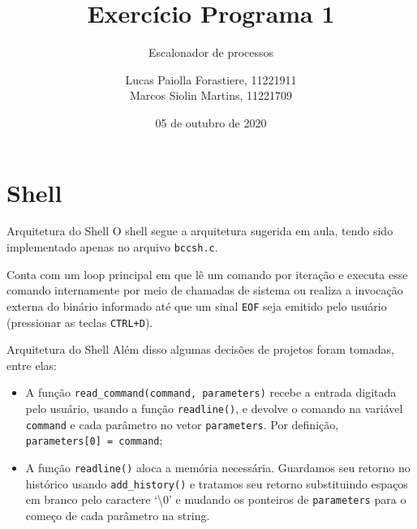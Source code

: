 \documentclass[10pt]{beamer}
\title{Exercício Programa 1}
\subtitle{Escalonador de processos}
\institute{IME-USP}
\author{Lucas Paiolla Forastiere, 11221911\\ Marcos Siolin Martins, 11221709}
\date{05 de outubro de 2020}
\begin{document}
    \maketitle
    \section{Shell}
    \begin{frame}{Arquitetura do Shell}
      O shell segue a arquitetura sugerida em aula, tendo sido implementado apenas no arquivo \texttt{bccsh.c}.

      Conta com um loop principal em que lê um comando por iteração e executa esse comando internamente por meio de chamadas de sistema ou realiza a invocação externa do binário informado até que um sinal \texttt{EOF} seja emitido pelo usuário (pressionar as teclas \texttt{CTRL+D}).
    \end{frame}
    \begin{frame}{Arquitetura do Shell}
      Além disso algumas decisões de projetos foram tomadas, entre elas:
      \begin{itemize}
        \justifying
        \item A função \texttt{read\_command(command, parameters)} recebe a entrada digitada pelo usuário, usando a função \texttt{readline()}, e devolve o comando na variável \texttt{command} e cada parâmetro no vetor \texttt{parameters}. Por definição, \texttt{parameters[0] = command};
        \item A função \texttt{readline()} aloca a memória necessária. Guardamos seu retorno no histórico usando \texttt{add\_history()} e tratamos seu retorno substituindo espaços em branco pelo caractere `\textbackslash 0' e mudando os ponteiros de \texttt{parameters} para o começo de cada parâmetro na string.
      \end{itemize}
    \end{frame}
\end{document}
